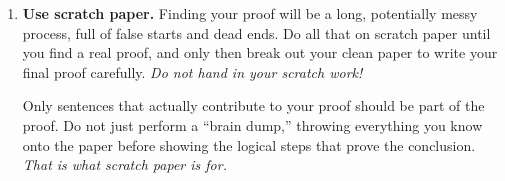 \begin{enumerate}
\item \textbf{Use scratch paper.} Finding your proof will be a long, potentially messy process, full of false starts and dead ends. Do all that on scratch paper
until you find a real proof, and only then break out your clean paper to write your final proof carefully. \emph{Do not hand in your scratch work!}

Only sentences that actually contribute to your proof should be part of the proof. Do not just perform a ``brain dump,'' throwing everything you know onto the paper before showing the logical steps that prove the conclusion. \emph{That is what scratch paper is for.}

\end{enumerate}